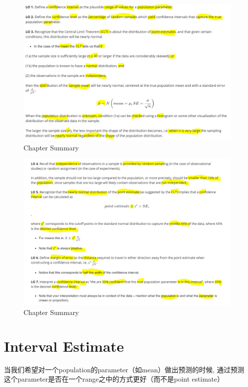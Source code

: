 \documentclass[]{book}
\begin{document}
\begin{figure}

{\centering \includegraphics[width=0.8\linewidth]{graphs/2-1} 

}

\caption{Chapter Summary}\label{fig:chap2-summary-fig1}
\end{figure}\begin{figure}

{\centering \includegraphics[width=0.8\linewidth]{graphs/2-2} 

}

\caption{Chapter Summary}\label{fig:chap2-summary-fig2}
\end{figure}

\section{Interval Estimate}\label{interval-estimate}

当我们希望对一个population的parameter（如mean）做出预测的时候,
通过预测这个parameter是否在一个range之中的方式更好（而不是point
estimate）
\end{document}
